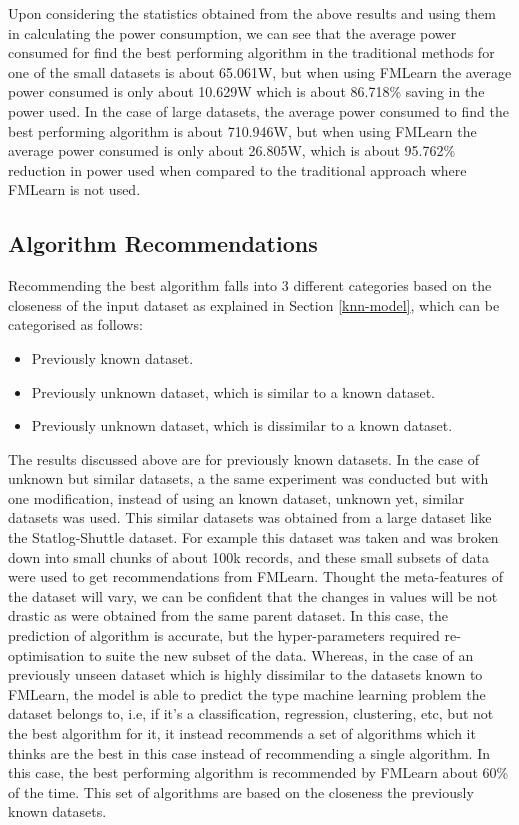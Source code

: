 Upon considering the statistics obtained from the above results and using them in calculating the power consumption, we can see that the average power consumed for find the best performing algorithm in the traditional methods for one of the small datasets is about 65.061W, but when using FMLearn the average power consumed is only about 10.629W which is about 86.718\% saving in the power used. In the case of large datasets, the average power consumed to find the best performing algorithm is about 710.946W, but when using FMLearn the average power consumed is only about 26.805W, which is about 95.762\% reduction in power used when compared to the traditional approach where FMLearn is not used.

\subsection*{Algorithm Recommendations}

Recommending the best algorithm falls into 3 different categories based on the closeness of the input dataset as explained in Section \ref{knn-model}, which can be categorised as follows:
\begin{itemize}
    \item Previously known dataset.
    \item Previously unknown dataset, which is similar to a known dataset.
    \item Previously unknown dataset, which is dissimilar to a known dataset.
\end{itemize}

The results discussed above are for previously known datasets. In the case of unknown but similar datasets, a the same experiment was conducted but with one modification, instead of using an known dataset, unknown yet, similar datasets was used. This similar datasets was obtained from a large dataset like the Statlog-Shuttle dataset. For example this dataset was taken and was broken down into small chunks of about 100k records, and these small subsets of data were used to get recommendations from FMLearn. Thought the meta-features of the dataset will vary, we can be confident that the changes in values will be not drastic as were obtained from the same parent dataset. In this case, the prediction of algorithm is accurate, but the hyper-parameters required re-optimisation to suite the new subset of the data. Whereas, in the case of an previously unseen dataset which is highly dissimilar to the datasets known to FMLearn, the model is able to predict the type machine learning problem the dataset belongs to, i.e, if it's a classification, regression, clustering, etc, but not the best algorithm for it, it instead recommends a set of algorithms which it thinks are the best in this case instead of recommending a single algorithm. In this case, the best performing algorithm is recommended by FMLearn about 60\% of the time. This set of algorithms are based on the closeness the previously known datasets.